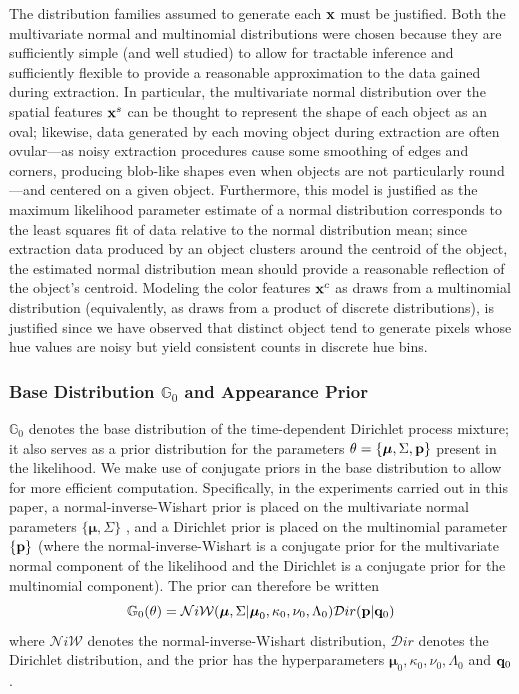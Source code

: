 \documentclass[twocolumn, final]{svjour3}
\begin{document}
The distribution families assumed to generate each $\bold{x}$ must be justified. Both the multivariate normal and multinomial distributions were chosen because they are sufficiently simple (and well studied) to allow for tractable inference and sufficiently flexible to provide a reasonable approximation to the data gained during extraction. In particular, the multivariate normal distribution over the spatial features $\bold{x}^{s}$ can be thought to represent the shape of each object as an oval; likewise, data generated by each moving object during extraction are often ovular---as noisy extraction procedures cause some smoothing of edges and corners, producing blob-like shapes even when objects are not particularly round---and centered on a given object.
Furthermore, this model is justified as the maximum likelihood parameter estimate of a normal distribution corresponds to the least squares fit of data relative to the normal distribution mean; since extraction data produced by an object clusters around the centroid of the object, the estimated normal distribution mean should provide a reasonable reflection of the object's centroid.
Modeling the color features $\bold{x}^{c}$ as draws from a multinomial distribution (equivalently, as draws from a product of discrete distributions), is justified since we have observed that distinct object tend to generate pixels whose hue values are noisy but yield consistent counts in discrete hue bins.






\subsubsection{Base Distribution $\mathbb{G}_{0}$ and Appearance Prior}

$\mathbb{G}_{0}$ denotes the base distribution of the time-dependent Dirichlet process mixture; it also serves as a prior distribution for the parameters $\theta = \{ \boldsymbol{\mu}, \Sigma, \bold{p} \}$ present in the likelihood. We make use of conjugate priors in the base distribution to allow for more efficient computation. Specifically, in the experiments carried out in this paper, a normal-inverse-Wishart prior is placed on the multivariate normal parameters $\{ \boldsymbol{\mu}, \Sigma \}$ , and a Dirichlet prior is placed on the multinomial parameter $ \{  \bold{p}  \} $ (where the normal-inverse-Wishart is a conjugate prior for the multivariate normal component of the likelihood and the Dirichlet is a conjugate prior for the multinomial component). The prior can therefore be written
\begin{equation}
\label{basedistro}
\mathbb{G}_{0}(\theta) = \mathcal{N}i\mathcal{W}(\boldsymbol{\mu}, \Sigma | \boldsymbol{\mu}_{0}, \kappa_{0}, \nu_{0}, \Lambda_{0})  \mathcal{D}ir( \bold{p} | \bold{q}_{0})
\end{equation}
where $\mathcal{N}i\mathcal{W}$ denotes the normal-inverse-Wishart distribution, $\mathcal{D}ir$ denotes the Dirichlet distribution, and the prior has the hyperparameters $\boldsymbol{\mu}_{0}, \kappa_{0}, \nu_{0}, \Lambda_{0}$ and $\bold{q}_{0}$.
\end{document}
